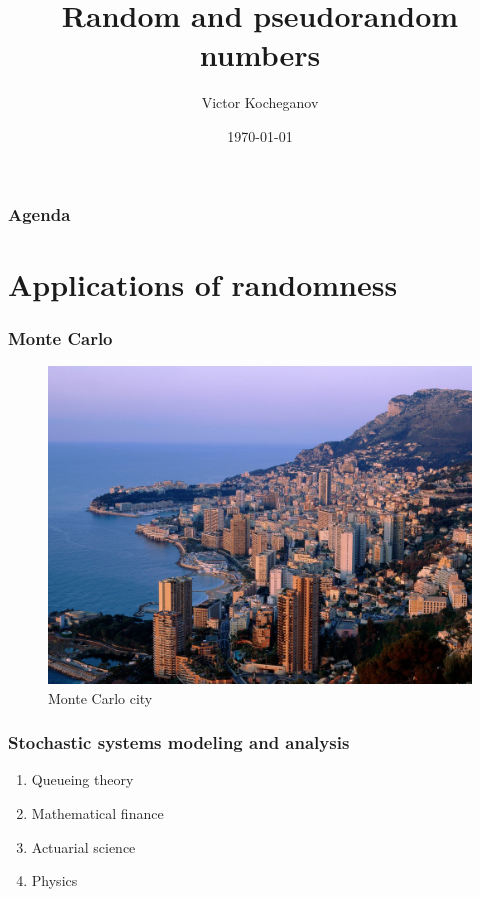 \documentclass[12pt]{beamer}
\begin{document}
\title{Random and pseudorandom numbers}
\author{Victor Kocheganov}
\date{\today} 

\begin{frame}
\titlepage
\end{frame}

\begin{frame}\frametitle{Agenda}\tableofcontents
\end{frame} 

\section{Applications of randomness} 
\begin{frame}\frametitle{Monte Carlo}	 
\begin{figure}
\includegraphics[scale=0.15]{MonteCarlo.jpg} 
\caption{Monte Carlo city}
\end{figure}
\end{frame}

\begin{frame}\frametitle{Stochastic systems modeling and analysis}
\begin{enumerate}
\item Queueing theory\pause 
\item Mathematical finance\pause 
\item Actuarial science\pause 
\item Physics
\end{enumerate}
\end{frame}
\end{document}
